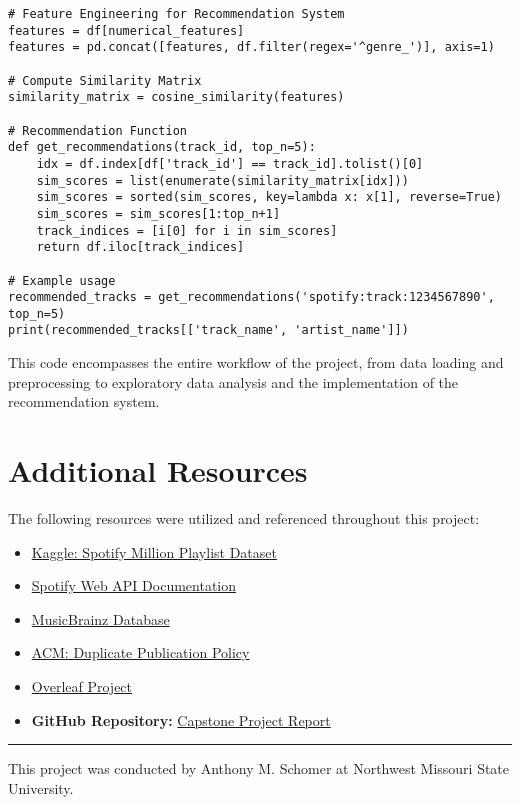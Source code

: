\documentclass[runningheads]{llncs}
\begin{document}
\begin{verbatim}
# Feature Engineering for Recommendation System
features = df[numerical_features]
features = pd.concat([features, df.filter(regex='^genre_')], axis=1)

# Compute Similarity Matrix
similarity_matrix = cosine_similarity(features)

# Recommendation Function
def get_recommendations(track_id, top_n=5):
    idx = df.index[df['track_id'] == track_id].tolist()[0]
    sim_scores = list(enumerate(similarity_matrix[idx]))
    sim_scores = sorted(sim_scores, key=lambda x: x[1], reverse=True)
    sim_scores = sim_scores[1:top_n+1]
    track_indices = [i[0] for i in sim_scores]
    return df.iloc[track_indices]

# Example usage
recommended_tracks = get_recommendations('spotify:track:1234567890', top_n=5)
print(recommended_tracks[['track_name', 'artist_name']])
\end{verbatim}

This code encompasses the entire workflow of the project, from data loading and preprocessing to exploratory data analysis and the implementation of the recommendation system.

\section{Additional Resources}
The following resources were utilized and referenced throughout this project:

\begin{itemize}
    \item \href{https://www.kaggle.com/datasets/shubhendra/million-playlist-dataset}{Kaggle: Spotify Million Playlist Dataset}
    \item \href{https://developer.spotify.com/documentation/web-api/}{Spotify Web API Documentation}
    \item \href{https://musicbrainz.org/}{MusicBrainz Database}
    \item \href{https://www.acm.org/publications/policies/duplicate-publication}{ACM: Duplicate Publication Policy}
    \item \href{https://www.overleaf.com/project}{Overleaf Project}
    \item \textbf{GitHub Repository:} \href{https://github.com/anythonyschomer/Capstone-Project-Report}{Capstone Project Report}
\end{itemize}

\vspace{-1em} %
\rule{\textwidth}{0.4pt} %
\vspace{-0.5em} %
This project was conducted by Anthony M. Schomer at Northwest Missouri State University.
\end{document}
